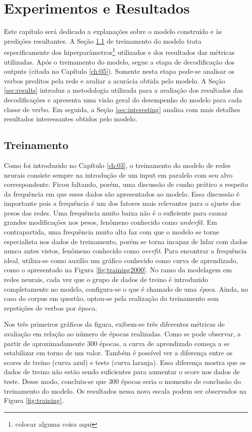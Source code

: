 \chapter{Experimentos e Resultados}
\label{ch:07}

Este capítulo será dedicado a explanações sobre o modelo construído e às predições resultantes. A Seção \ref{sec:treinamento} de treinamento do modelo trata especificamente dos hiperparâmetros\footnote{colocar alguma coisa aqui} utilizados e dos resultados das métricas utilizadas. Após o treinamento do modelo, segue a etapa de decodificação dos outputs (citada no Capítulo \ref{ch:05}). Somente nesta etapa pode-se analisar os verbos preditos pela rede e avaliar a acurácia obtida pelo modelo. A Seção \ref{sec:results} introduz a metodologia utilizada para a avaliação dos resultados das decodificações e apresenta uma visão geral do desempenho do modelo para cada classe de verbo. Em seguida, a Seção \ref{sec:interesting} analisa com mais detalhes resultados interessantes obtidos pelo modelo. 

\section{Treinamento}
\label{sec:treinamento}

Como foi introduzido no Capítulo \ref{ch:03}, o treinamento do modelo de redes neurais consiste sempre na introdução de um input em paralelo com seu alvo correspondente. Ficou faltando, porém, uma discussão de cunho prático a respeito da frequência em que esses dados são apresentados ao modelo. Essa discussão é importante pois a frequência é um dos fatores mais relevantes para o ajuste dos pesos das redes. Uma frequência muito baixa não é o suficiente para causar grandes modificações nos pesos, fenômeno conhecido como \textit{underfit}. Em contrapartida, uma frequência muito alta faz com que o modelo se torne especialista nos dados de treinamento, porém se torna incapaz de lidar com dados nunca antes vistos, fenômeno conhecido como \textit{overfit}. Para encontrar a frequência ideal, utiliza-se como auxílio um gráfico conhecido como curva de aprendizado, como o apresentado na Figura \ref{fig:training2000}. No ramo da modelagem em redes neurais, cada vez que o grupo de dados de treino é introduzido completamente no modelo, configura-se o que é chamado de uma \textit{época}. Ainda, no caso do corpus em questão, optou-se pela realização do treinamento sem repetições de verbos por época.  

Nos três primeiros gráficos da figura, exibem-se três diferentes métricas de avaliação em relação ao número de épocas realizadas. 
Como se pode observar, a partir de aproximadamente 300 épocas, a curva de aprendizado começa a se estabilizar em torno de um valor. Também é possível ver a diferença entre os scores de treino (curva azul) e teste (curva laranja). Essa diferença mostra que os dados de treino não estão sendo suficientes para aumentar o score nos dados de teste. Desse modo, concluiu-se que 300 épocas seria o momento de conclusão do treinamento do modelo. Os resultados nessa nova escala podem ser observados na Figura \ref{fig:training}.  

